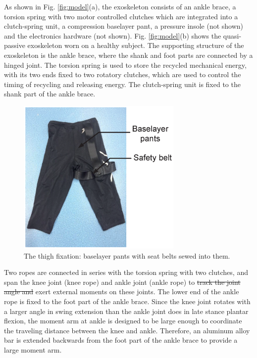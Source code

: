 \documentclass[twocolumn,cleanfoot,10pt]{asme2ej}
\begin{document}
As shown in Fig. \ref{fig:model}(a), the exoskeleton consists of an ankle brace, a torsion spring with two motor controlled clutches which are integrated into a clutch-spring unit, a compression baselayer pant, a pressure insole (not shown) and the electronics hardware (not shown).
Fig. \ref{fig:model}(b) shows the quasi-passive exoskeleton worn on a healthy subject.
The supporting structure of the exoskeleton is the ankle brace, where the shank and foot parts are connected by a hinged joint.
The torsion spring is used to store the recycled mechanical energy, with its two ends fixed to two rotatory clutches, which are used to control the timing of recycling and releasing energy.
The clutch-spring unit is fixed to the shank part of the ankle brace.


\begin{figure}[b]
	\centering
	\includegraphics[width=8cm]{Figure3.eps}
	\caption{The thigh fixation: baselayer pants with seat belts sewed into them.}
	\label{fig:pants}   
\end{figure}

Two ropes are connected in series with the torsion spring with two clutches, and span the knee joint (knee rope) and ankle joint (ankle rope) to \sout{track the joint angle and }exert external moments on these joints.
The lower end of the ankle rope is fixed to the foot part of the ankle brace.
Since the knee joint rotates with a larger angle in swing extension than the ankle joint does in late stance plantar flexion, the moment arm at ankle is designed to be large enough to coordinate the traveling distance between the knee and ankle.
Therefore, an aluminum alloy bar is extended backwards from the foot part of the ankle brace to provide a large moment arm.
\end{document}
